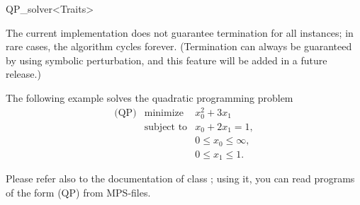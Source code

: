 \begin{ccRefClass}{QP_solver<Traits>}
\begin{ccIndexMemberFunctions}



\end{ccIndexMemberFunctions}


\ccSeeAlso
%

\ccImplementation
\ccIndexImplementation

The current implementation does not guarantee termination for all
instances; in rare cases, the algorithm cycles forever.  (Termination
can always be guaranteed by using symbolic perturbation, and this
feature will be added in a future release.)

\ccExample

The following example solves the quadratic programming problem
\begin{eqnarray*}
\mbox{(QP)}&\mbox{minimize} & x_0^2 + 3x_1 \\
&\mbox{subject to}   & x_0+2x_1=1, \\
&& 0 \le  x_0 \le \infty, \\
&& 0 \le  x_1 \le 1.
\end{eqnarray*}


Please refer also to the documentation of class
; using it, you can read programs of
the form (QP) from MPS-files.
\end{ccRefClass}


